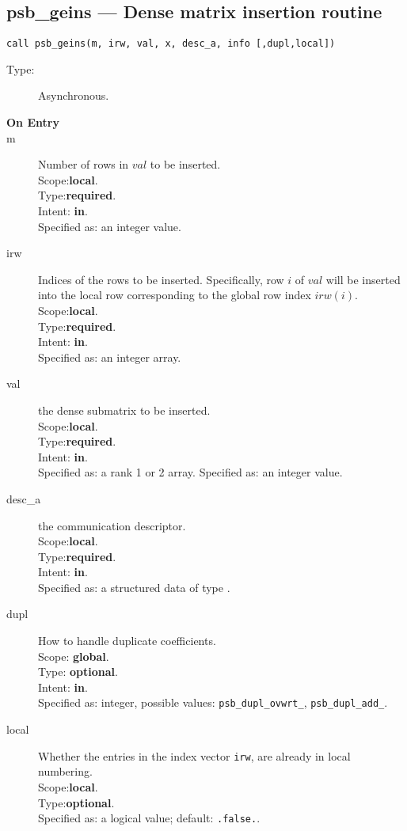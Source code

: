 %
%
\clearpage\subsection*{psb\_geins --- Dense matrix insertion routine}

\begin{verbatim}
call psb_geins(m, irw, val, x, desc_a, info [,dupl,local])
\end{verbatim}

\begin{description}
\item[Type:] Asynchronous.
\item[\bf On Entry]
\item[m] Number of rows in $val$  to be inserted.\\
Scope:{\bf local}.\\
Type:{\bf required}.\\
Intent: {\bf in}.\\
Specified as: an integer value.
\item[irw] Indices of the rows to be inserted. Specifically, row $i$
  of $val$ will be inserted into the local row corresponding to the
  global row index $irw(i)$.
Scope:{\bf local}.\\
Type:{\bf required}.\\
Intent: {\bf in}.\\
Specified as: an integer array.
\item[val] the dense submatrix to be inserted.\\
Scope:{\bf local}.\\
Type:{\bf required}.\\
Intent: {\bf in}.\\
Specified as: a rank 1 or 2  array.
Specified as: an integer value.
\item[desc\_a] the communication descriptor.\\
Scope:{\bf local}.\\
Type:{\bf required}.\\
Intent: {\bf in}.\\
Specified as: a structured data of type \descdata.
\item[dupl] How to handle duplicate coefficients.\\
Scope: {\bf global}.\\
Type: {\bf optional}.\\
Intent: {\bf in}.\\
Specified as: integer, possible values: \verb|psb_dupl_ovwrt_|,
\verb|psb_dupl_add_|.
\item[local] Whether the entries in the index vector \verb|irw|,
   are already in local  numbering. \\
 Scope:{\bf local}.\\
 Type:{\bf optional}.\\
 Specified as: a logical value; default: \verb|.false.|.

\end{description}

